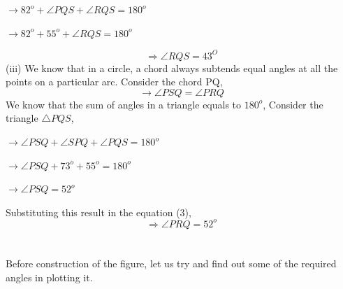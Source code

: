 \documentclass[8pt, twocolumn]{article}
\begin{document}
\begin{center}
    $\rightarrow 82^o + \angle PQS + \angle RQS = 180^o $
\end{center}
\begin{center}
    $\rightarrow 82^o + 55^o + \angle RQS = 180^o$
\end{center}
\begin{equation}
    \Rightarrow \angle RQS = 43^O
\end{equation}
(iii) We know that in a circle, a chord always subtends equal angles at all the points on a particular arc. Consider the chord PQ,
\begin{equation}
    \rightarrow \angle PSQ = \angle PRQ
\end{equation}
We know that the sum of angles in a triangle equals to $180^o$, Consider the triangle $\triangle PQS$,
\begin{center}
    $\rightarrow \angle PSQ + \angle SPQ + \angle PQS = 180^o$ 
\end{center}
\begin{center}
    $\rightarrow \angle PSQ + 73^o + 55^o = 180^o $
\end{center}
\begin{center}
    $\rightarrow \angle PSQ = 52^o$
\end{center}
Substituting this result in the equation (3),
\begin{equation}
    \Rightarrow \angle PRQ = 52^o
\end{equation}\\\\
Before construction of the figure, let us try and find out some of the required angles in plotting it.\\
\end{document}
